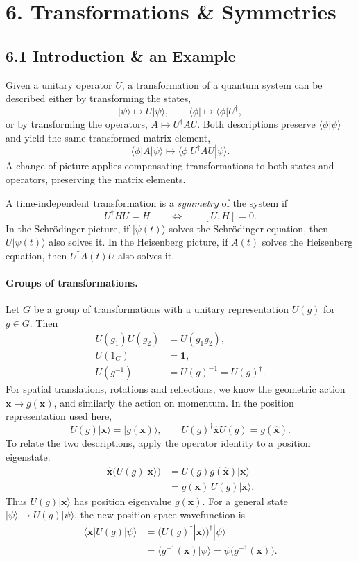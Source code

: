 \documentclass[11pt,a4paper]{article}
\begin{document}
\section*{6. Transformations \& Symmetries}

\subsection*{6.1 Introduction \& an Example}

Given a unitary operator $U$, a transformation of a quantum system
can be described either by transforming the states,
\[
    |\psi\rangle\mapsto U|\psi\rangle,\qquad
    \langle\phi|\mapsto\langle\phi|U^\dagger,
\]
or by transforming the operators, $A\mapsto U^\dagger A U$.
Both descriptions preserve $\langle\phi|\psi\rangle$ and yield
the same transformed matrix element,
\[
    \langle\phi|A|\psi\rangle
        \mapsto \langle\phi|U^\dagger A U|\psi\rangle.
\]
A change of picture applies compensating transformations to both
states and operators, preserving the matrix elements.

A time-independent transformation is a \emph{symmetry} of the
system if
\[
    U^\dagger H U=H
    \qquad\Longleftrightarrow\qquad [U,H]=0.
\]
In the Schr\"odinger picture, if $|\psi(t)\rangle$ solves the
Schr\"odinger equation, then $U|\psi(t)\rangle$ also solves it.
In the Heisenberg picture, if $A(t)$ solves the Heisenberg equation,
then $U^\dagger A(t)U$ also solves it.

\paragraph{Groups of transformations.}
Let $G$ be a group of transformations with a unitary representation
$U(g)$ for $g\in G$. Then
\begin{align*}
    U(g_1)U(g_2)&=U(g_1g_2),\\
    U(1_G)&=\mathbf 1,\\
    U(g^{-1})&=U(g)^{-1}=U(g)^\dagger.
\end{align*}
For spatial translations, rotations and reflections, we know
the geometric action $\mathbf x\mapsto g(\mathbf x)$, and similarly
the action on momentum. In the position representation used here,
\[
    U(g)|\mathbf x\rangle=|g(\mathbf x)\rangle,\qquad
    U(g)^\dagger\hat{\mathbf x}U(g)=g(\hat{\mathbf x}).
\]
To relate the two descriptions, apply the operator identity to a
position eigenstate:
\begin{align*}
    \hat{\mathbf x}\bigl(U(g)|\mathbf x\rangle\bigr)
        &=U(g)g(\hat{\mathbf x})|\mathbf x\rangle\\
        &=g(\mathbf x)\,U(g)|\mathbf x\rangle.
\end{align*}
Thus $U(g)|\mathbf x\rangle$ has position eigenvalue $g(\mathbf x)$.
For a general state $|\psi\rangle\mapsto U(g)|\psi\rangle$, the new
position-space wavefunction is
\begin{align*}
    \langle\mathbf x|U(g)|\psi\rangle
        &=\bigl(U(g)^\dagger|\mathbf x\rangle\bigr)^\dagger|\psi\rangle\\
        &=\langle g^{-1}(\mathbf x)|\psi\rangle
         =\psi\bigl(g^{-1}(\mathbf x)\bigr).
\end{align*}
\end{document}
